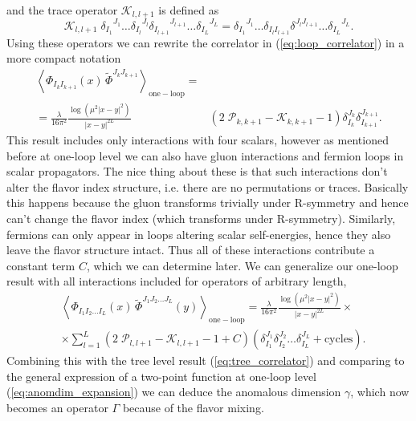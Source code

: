 and the trace operator $\mathcal{K}_{l,l+1}$ is defined as
\begin{equation}
	\mathcal{K}_{l,l+1} \; {\delta_{I_{1}}}^{J_{1}} \dots {\delta_{I_{l}}}^{J_{l}} {\delta_{I_{l+1}}}^{J_{l+1}} \dots {\delta_{I_{L}}}^{J_{L}} = {\delta_{I_{1}}}^{J_{1}} \dots {\delta_{I_l I_{l+1}}} {\delta}^{J_{l} J_{l+1}} \dots {\delta_{I_{L}}}^{J_{L}}.
\end{equation}
Using these operators we can rewrite the correlator in (\ref{eq:loop_correlator}) in a more compact notation
\begin{eqnarray}
	  \left< \Phi_{I_k I_{k+1}}(x) \, \tilde{\Phi}^{J_k J_{k+1}} \right>_{\mathrm{one-loop}} = &  \nonumber \\
	  = \frac{\lambda}{16\pi^2} \frac{\log (\mu^2|x-y|^2)}{|x-y|^{2L}} 
	 & \left( 2 \; \mathcal{P}_{k,k+1} - \mathcal{K}_{k,k+1} - 1 \right) \delta_{I_k}^{J_{k}} \delta_{I_{k+1}}^{J_{k+1}}.
\end{eqnarray}
This result includes only interactions with four scalars, however as mentioned before at one-loop level we can also have gluon interactions and fermion loops in scalar propagators. 
The nice thing about these is that such interactions don't alter the flavor index structure, i.e. there are no permutations or traces. 
Basically this happens because the gluon transforms trivially under R-symmetry and hence can't change the flavor index (which transforms under R-symmetry). 
Similarly, fermions can only appear in loops altering scalar self-energies, hence they also leave the flavor structure intact.
Thus all of these interactions contribute a constant term $C$, which we can determine later. We can generalize our one-loop result with all interactions included for operators of arbitrary length,
\begin{equation}
\begin{split}
	 & \left< \Phi_{I_1 I_2 \dots I_L}(x) \, \tilde{\Phi}^{J_1 J_2 \dots J_L}(y)  \right>_{\mathrm{one-loop}}
	  = \frac{\lambda}{16\pi^2} \frac{\log (\mu^2|x-y|^2)}{|x-y|^{2L}} \times \nonumber \\
	 & \times \sum_{l=1}^L \left( 2 \; \mathcal{P}_{l,l+1} - \mathcal{K}_{l,l+1} - 1 + C\right)
	  \left( \delta_{I_1}^{J_1} \delta_{I_2}^{J_2} \dots \delta_{I_L}^{J_L} + \mathrm{cycles} \right).
\end{split}
\end{equation}
Combining this with the tree level result (\ref{eq:tree_correlator}) and comparing to the general expression of a two-point function at one-loop level (\ref{eq:anomdim_expansion}) we can deduce the anomalous dimension $\gamma$, which now becomes an operator $\Gamma$ because of the flavor mixing. 
